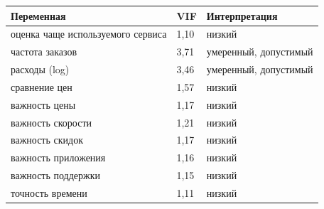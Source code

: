 {%
\small
\setlength{\tabcolsep}{3.0pt}
\renewcommand{\arraystretch}{1.12}
\begin{adjustbox}{max width=\textwidth}
\begin{tabular}{L{7.2cm}C{2.0cm}L{4.5cm}}
\toprule
Переменная & VIF & Интерпретация \\
\midrule
оценка чаще используемого сервиса & 1,10 & низкий \\
частота заказов & 3,71 & умеренный, допустимый \\
расходы (log) & 3,46 & умеренный, допустимый \\
сравнение цен & 1,57 & низкий \\
важность цены & 1,17 & низкий \\
важность скорости & 1,21 & низкий \\
важность скидок & 1,17 & низкий \\
важность приложения & 1,16 & низкий \\
важность поддержки & 1,15 & низкий \\
точность времени & 1,11 & низкий \\
\bottomrule
\end{tabular}
\end{adjustbox}
}